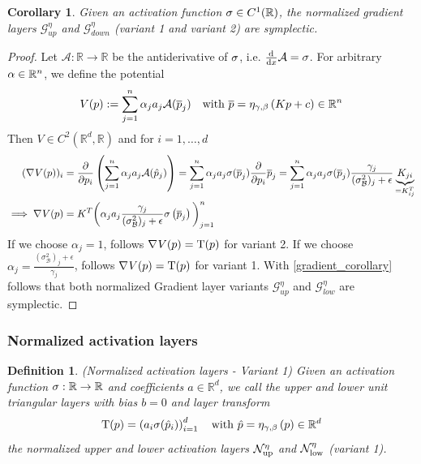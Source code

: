 \documentclass[twoside,a4paper]{article}
\newtheorem{definition}{Definition}
\newtheorem{corollary}{Corollary}
\begin{document}
\begin{corollary}\label{cor_norm_gradient_layers_symp}
	Given an activation function $\sigma \in C^1(\mathbb{R})$,
	the normalized gradient layers $\mathcal{G}^{\eta}_{up}$ and $\mathcal{G}^{\eta}_{down}$
	(variant 1 and variant 2) are symplectic.
\end{corollary}
\begin{proof}
	Let $\mathcal{A}: \mathbb{R} \to \mathbb{R}$ be the antiderivative of $\sigma$, 
	i.e. $\frac{\mathrm{d}^{}}{\mathrm{d}x} \mathcal{A} = \sigma$. For arbitrary $\alpha \in \mathbb{R}^n$, we define the potential
	\begin{equation*}
		V(p) := \sum_{j=1}^n \alpha_j a_j \mathcal{A}(\overline{p}_j)
		\quad \text{with } \overline{p} = \eta_{\gamma, \beta} \left( Kp + c \right) \in \mathbb{R}^n
	\end{equation*}
	Then $V \in C^2(\mathbb{R}^d, \mathbb{R})$ and for $i=1, \dots, d$
	\begin{align*}
		(\nabla_{}{V(p)})_i &= \frac{\partial }{\partial p_i} \left( \sum_{j=1}^n \alpha_j a_j \mathcal{A}(\hat{p}_j) \right)
		= \sum_{j=1}^n \alpha_j a_j \sigma(\overline{p}_j) \frac{\partial }{\partial p_i} \overline{p}_j
		= \sum_{j=1}^n \alpha_j a_j \sigma(\overline{p}_j)
		\frac{\gamma_j}{(\sigma^2_\mathcal{B})_j + \epsilon} \underbrace{K_{ji}}_{=K^T_{ij}} \\
		\implies
		\nabla_{}{V(p)}
		&= K^T \bigg( \alpha_j a_j \frac{\gamma_j}{(\sigma^2_\mathcal{B})_j + \epsilon}
		\sigma \left( \overline{p}_j \right) \bigg)_{j=1}^n
	\end{align*}
	If we choose $\alpha_j = 1$, follows $\nabla_{}{V(p)} = \mathrm{T}(p)$ for variant 2.
	If we choose $\alpha_j = \frac{(\sigma^2_\mathcal{B})_j + \epsilon}{\gamma_j}$,
	follows $\nabla_{}{V(p)} = \mathrm{T}(p)$ for variant 1.
	With \cref{gradient_corollary} follows that both normalized Gradient layer variants
	$\mathcal{G}_{up}^\eta$ and $\mathcal{G}_{low}^\eta$ are symplectic.
\end{proof}


\subsubsection{Normalized activation layers}

\begin{definition}
	(Normalized activation layers - Variant 1)
	Given an activation function $\sigma : \mathbb{R} \to \mathbb{R}$ and coefficients $a \in \mathbb{R}^d$, 
	we call the upper and lower unit triangular layers with bias $b=0$ and layer transform
	\begin{equation*}
		\mathrm{T}(p) = \left( a_i \sigma(\hat{p}_i) \right)_{i=1}^d
		\quad \text{with } \hat{p} = \eta_{\gamma, \beta} \left( p \right) \in \mathbb{R}^d
	\end{equation*}
	the normalized upper and lower activation layers $\mathcal{N}_{\text{up}}^\eta$ and $\mathcal{N}_{\text{low}}^\eta$
	(variant 1).
\end{definition}
\end{document}
